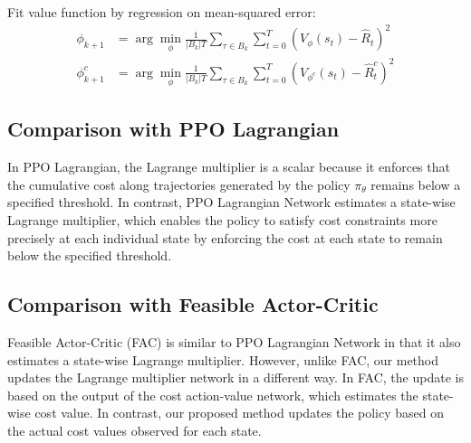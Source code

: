 \begin{algorithm}
{    
    Fit value function by regression on mean-squared error:
    \begin{equation*}
      \begin{aligned}
        \phi_{k + 1} &= \arg\min_\phi \frac{1}{|B_k|T} \sum_{\tau \in B_k} \sum^T_{t = 0} \left( V_\phi(s_t) - \hat{R}_t \right)^2 \\
        \phi^c_{k + 1} &= \arg\min_\phi \frac{1}{|B_k|T} \sum_{\tau \in B_k} \sum^T_{t = 0} \left( V_{\phi^c}(s_t) - \hat{R}^c_t \right)^2
      \end{aligned}
    \end{equation*}
  }
\end{algorithm}

\subsection{Comparison with PPO Lagrangian}

In PPO Lagrangian, the Lagrange multiplier is a scalar because it enforces that the cumulative cost along trajectories generated by the policy $\pi_\theta$ remains below a specified threshold.
In contrast, PPO Lagrangian Network estimates a state-wise Lagrange multiplier, which enables the policy to satisfy cost constraints more precisely at each individual state by enforcing the cost at each state to remain below the specified threshold.

\subsection{Comparison with Feasible Actor-Critic}

Feasible Actor-Critic (FAC) is similar to PPO Lagrangian Network in that it also estimates a state-wise Lagrange multiplier.
However, unlike FAC, our method updates the Lagrange multiplier network in a different way.
In FAC, the update is based on the output of the cost action-value network, which estimates the state-wise cost value.
In contrast, our proposed method updates the policy based on the actual cost values observed for each state.